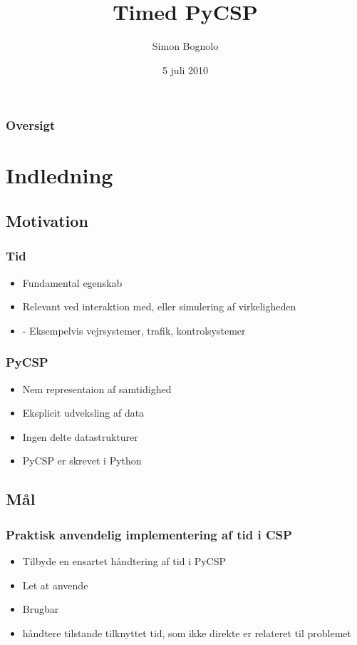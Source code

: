 \documentclass[12pt]{beamer}
\title
{Timed PyCSP}
\institute
{Datalogisk Institut \\ Københavns Universitet}
\author
{Simon Bognolo}
\date
{5 juli 2010}
\begin{document}
\frame[plain]\titlepage

\begin{frame}
  \frametitle{Oversigt}
  \tableofcontents
\end{frame}

\section{Indledning}
\subsection{Motivation}
\begin{frame}
  \frametitle{Tid}
  \begin{itemize}
	\item Fundamental egenskab
	\item Relevant ved interaktion med, eller simulering af virkeligheden
	\item - Eksempelvis vejrsystemer, trafik, kontrolsystemer 
  \end{itemize}
\end{frame}

\begin{frame}
  \frametitle{PyCSP}
  \begin{itemize}
	\item  Nem representaion af samtidighed
	\item Eksplicit udveksling af data
	\item Ingen delte datastrukturer
	\item PyCSP er skrevet i Python
 \end{itemize}
\end{frame}

\subsection{Mål}
\begin{frame}
  \frametitle{Praktisk anvendelig implementering af tid i CSP}
  \begin{itemize}
	\item Tilbyde en ensartet håndtering af tid i PyCSP
	\item Let at anvende
	\item Brugbar
	\item håndtere tilstande tilknyttet tid, som ikke direkte er relateret til problemet
  \end{itemize}
\end{frame}
\end{document}
